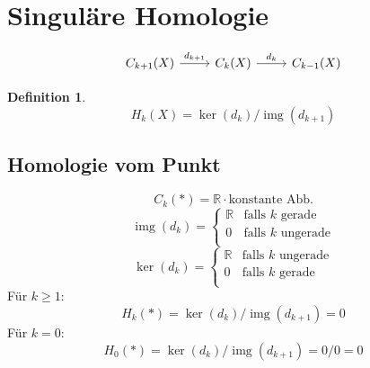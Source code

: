 \documentclass{article}
\title{\titlevar}
\author{\authorvar}
\date{\datevar}
\DeclareMathOperator{\img}{img}
\newtheorem{definition}{Definition}
\begin{document}
	\maketitle
	
	\section{Singuläre Homologie}

	\[\begin{tikzcd}
		{C_{k+1}(X)} & {C_k(X)} & {C_{k-1}(X)}
		\arrow["{d_{k+1}}", from=1-1, to=1-2]
		\arrow["{d_k}", from=1-2, to=1-3]
	\end{tikzcd}\]
	
	\begin{definition}
		\begin{equation*}
			H_k(X) = \ker(d_k) / \img(d_{k+1})
		\end{equation*}
	\end{definition}
	
	\subsection{Homologie vom Punkt}
	
	\begin{equation*}
		C_k(*) = ℝ · \text{konstante Abb.}
	\end{equation*}
	\begin{equation*}
		\img(d_k) = \begin{cases}
			ℝ & \text{falls $k$ gerade}\\
			0 & \text{falls $k$ ungerade}\\
		\end{cases}	
	\end{equation*}
	\begin{equation*}
		\ker(d_k) = \begin{cases}
			ℝ & \text{falls $k$ ungerade}\\
			0 & \text{falls $k$ gerade}\\
		\end{cases}
	\end{equation*}
	Für $k≥1$:
	\begin{equation*}
		H_k(*) = \ker(d_k) / \img(d_{k+1}) = 0
	\end{equation*}
	Für $k=0$:
	\begin{equation*}
		H_0(*) = \ker(d_k) / \img(d_{k+1}) = 0/0 = 0
	\end{equation*}
	
\end{document}
